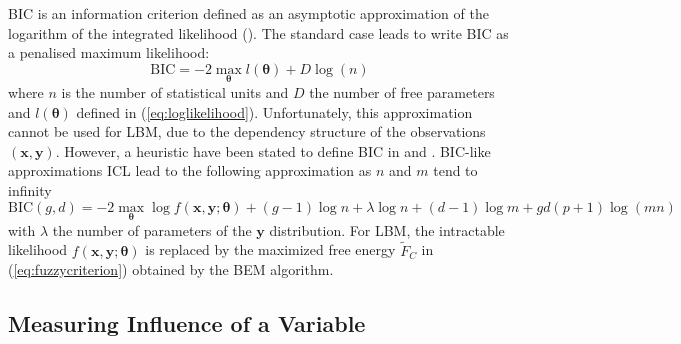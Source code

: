\documentclass[a4paper]{article}
\newcommand{\bx}{\mathbf{x}}
\newcommand{\by}{\mathbf{y}}
\newcommand{\btheta}{\boldsymbol{\theta}}
\begin{document}
BIC is an information criterion defined as an asymptotic approximation of the logarithm of the integrated likelihood
(\cite{schwarz1978estimating}). The standard case leads to
write BIC as a penalised maximum likelihood:
$$
\mathrm{BIC} = -2\max_{\btheta} l(\btheta) + D \log(n)
$$
where $n$ is the number of statistical units and $D$ the number
of free parameters and $l(\btheta)$ defined in (\ref{eq:loglikelihood}).
Unfortunately, this approximation cannot be
used for LBM, due to the dependency structure of the observations
$(\bx,\by)$. However, a heuristic have been stated to define BIC
in \cite{keribin2012model} and \cite{keribin2015estimation}.
BIC-like approximations ICL lead to the following approximation
as $n$ and $m$ tend to infinity
\begin{equation}
\mathrm{BIC}(g,d) = -2\max_{\btheta}\log f(\bx, \by;\btheta) + (g-1)\log n  + \lambda\log n
+ (d-1)\log m + gd(p+1) \log(mn)
\end{equation}
with $\lambda$ the number of parameters of the $\by$ distribution.
For LBM, the intractable likelihood $f(\bx, \by;\btheta)$ is replaced by the maximized
free energy $\tilde{F}_C$ in (\ref{eq:fuzzycriterion}) obtained by the BEM algorithm.

\subsection{Measuring Influence of a Variable}
\end{document}
